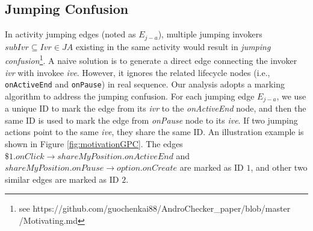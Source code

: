 \subsection{Jumping Confusion}\label{jumpConfusion}
In activity jumping edges (noted as $E_{j-a}$), multiple jumping invokers $subIvr\subseteq Ivr\in JA$  existing in the same activity would result in \textit{jumping confusion}\footnote{see https://github.com/guochenkai88/AndroChecker\_paper/blob/master\\/Motivating.md}. A naive solution is to generate a direct edge connecting the invoker \textit{ivr} with invokee \textit{ive}. However, it ignores the related lifecycle nodes (i.e., \texttt{onActiveEnd} and \texttt{onPause}) in real sequence. Our analysis adopts a marking algorithm to address the jumping confusion. For each jumping edge $E_{j-a}$, we use a unique ID to mark the edge from its \textit{ivr} to the \textit{onActiveEnd} node, and then the same ID is used to mark the edge from \textit{onPause} node to its \textit{ive}. If two jumping actions point to the same \textit{ive}, they share the same ID. An illustration example is shown in Figure \ref{fig:motivationGPC}. The edges $\$1.onClick\rightarrow shareMyPosition.onActiveEnd$ and $shareMyPosition.onPause\rightarrow option.onCreate$ are marked as ID $1$, and other two similar edges are marked as ID $2$.



